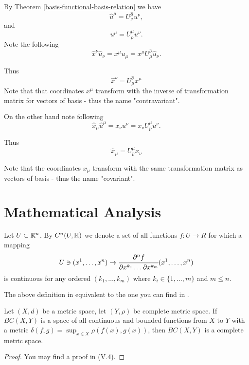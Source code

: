 \documentclass[main.tex]{subfiles}
\begin{document}
By Theorem \ref{basis-functional-basis-relation} we have
\begin{equation}
\hat{u}^\mu =  U^{\hat{\mu}}_{\nu} u^\nu,
\end{equation}
and 
\begin{equation}
u^\mu = U^{\mu}_{\hat{\nu}} u^\nu.
\end{equation}
Note the following
\begin{equation}
\hat{x}^\nu \hat{u}_\nu = x^\mu u_\mu = x^\mu U^{\hat{\nu}}_\mu  \hat{u}_\nu.
\end{equation}

Thus
\begin{equation}
\boxed{
\hat{x}^\nu = U^{\hat{\nu}}_\mu x^\mu 
}
\end{equation}
Note that that coordinates $x^\mu$ transform with the inverse of transformation matrix for vectors of basis - thus the name "contravariant".

On the other hand note following
\begin{equation}
\hat{x}_\mu \hat{u}^\mu = x_\nu u^\nu = x_\nu U^{\mu}_{\hat{\nu}} u^\nu.
\end{equation}

Thus
\begin{equation}
\boxed{
\hat{x}_\mu = U^{\mu}_{\hat{\nu}} x_\nu}
\end{equation}

Note that the coordinates $x_\mu$ transform with the same transformation matrix as vectors of basis - thus the name "covariant".

\section{Mathematical Analysis}
\begin{definition}
Let $U\subset \mathbb{R}^n$.
By $C^n(U, \mathbb{R})$ we denote a set of all functions $f:U\to R$ for which a mapping
\begin{equation}
    U\ni (x^1, \dots, x^n) \to \cfrac{\partial^n f}{\partial x^{k_1} \dots \partial x^{k_m} } (x^1, \dots, x^n)
\end{equation}
is continuous for any ordered $(k_1, \dots, k_m)$ where $k_i\in\{1, \dots, m\}$ and $m\leq n$.
\end{definition}

The above definition in equivalent to the one you can find in \cite{warner1983}. 

\begin{theorem}
\label{continous_functions_space_complete}
Let $(X, d)$ be a metric space, let $(Y, \rho)$ be complete metric space. If $BC(X, Y)$ is a space of all continuous and bounded functions from $X$ to $Y$ with a metric $\delta(f, g) = \sup_{x\in X} \rho(f(x), g(x))$, then $BC(X, Y)$ is a complete metric space.
\end{theorem}
\begin{proof}
You may find a proof in \cite{maurin1976} (V.4).
\end{proof}
\end{document}
